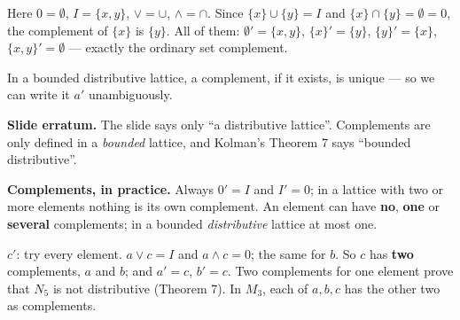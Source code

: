 \documentclass{fkt-notes}
\newcommand{\erratum}[1]{\par\noindent\textbf{Slide erratum.} #1\par}
\theoremstyle{definition}
\begin{document}
\begin{example}[Ex.~19: $L=\mathcal P(\{x,y\})$]
  Here $0=\emptyset$, $I=\{x,y\}$, $\vee=\cup$, $\wedge=\cap$. Since
  $\{x\}\cup\{y\}=I$ and $\{x\}\cap\{y\}=\emptyset=0$, the complement of
  $\{x\}$ is $\{y\}$. All of them:
  $\emptyset'=\{x,y\}$, $\{x\}'=\{y\}$, $\{y\}'=\{x\}$,
  $\{x,y\}'=\emptyset$ --- exactly the ordinary set complement.
\end{example}

\begin{rulebox}[title={6.3 Theorem 7}]
  In a bounded distributive lattice, a complement, if it exists, is
  unique --- so we can write it $a'$ unambiguously.
\end{rulebox}
\erratum{The slide says only ``a distributive lattice''. Complements are
  only defined in a \emph{bounded} lattice, and Kolman's Theorem 7 says
  ``bounded distributive''.}

\textbf{Complements, in practice.} Always $0'=I$ and $I'=0$; in a lattice with two or more elements nothing is its own complement. An element can have \textbf{no}, \textbf{one} or \textbf{several} complements; in a bounded \emph{distributive} lattice at most one.

\begin{center}
  \hspace{2cm}
\end{center}

\begin{example}
  $c'$: try every element. $a \vee c = I$ and $a \wedge c = 0$; the same
  for $b$. So $c$ has \textbf{two} complements, $a$ and $b$; and
  $a' = c$, $b' = c$. Two complements for one element prove that $N_5$
  is not distributive (Theorem 7). In $M_3$, each of $a, b, c$ has the
  other two as complements.
\end{example}
\end{document}
